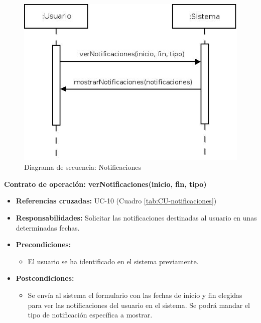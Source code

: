 \vspace{7mm}
\dotfill
\vspace{7mm}

\begin{figure}[h!]
\centering
  \includegraphics[scale=.50]{img/secuencias/notificaciones.jpeg}
  \caption{Diagrama de secuencia: Notificaciones}
  \label{fig:secuencia-notificaciones}
\end{figure}

\textbf{Contrato de operación: verNotificaciones(inicio, fin, tipo)}
\begin{itemize}
\item \textbf{Referencias cruzadas:} UC-10 (Cuadro \ref{tab:CU-notificaciones})
\item \textbf{Responsabilidades:} Solicitar las notificaciones destinadas al usuario en unas determinadas fechas.
\item \textbf{Precondiciones:} 
 \begin{itemize}
\item El usuario se ha identificado en el sistema previamente.
\end {itemize}
\item \textbf{Postcondiciones:} 
 \begin{itemize}
\item Se envía al sistema el formulario con las fechas de inicio y fin elegidas para ver las notificaciones del usuario en el sistema. Se podrá mandar el tipo de notificación específica a mostrar.
\end {itemize}
\end {itemize}

